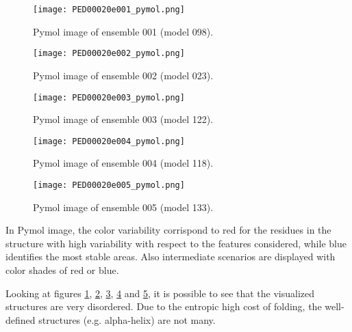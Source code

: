 \begin{figure}[H]
    \centering
		\texttt{[image: PED00020e001\_pymol.png]}
		\caption{Pymol image of ensemble 001 (model 098).}
		\label{model001p}
\end{figure}

\begin{figure}[H]
    \centering
		\texttt{[image: PED00020e002\_pymol.png]}
		\caption{Pymol image of ensemble 002 (model 023).}
		\label{model002p}
\end{figure}

\begin{figure}[H]
    \centering
		\texttt{[image: PED00020e003\_pymol.png]}
		\caption{Pymol image of ensemble 003 (model 122).}
		\label{model003p}
\end{figure}

\begin{figure}[H]
    \centering
		\texttt{[image: PED00020e004\_pymol.png]}
		\caption{Pymol image of ensemble 004 (model 118).}
		\label{model004p}
\end{figure}

\begin{figure}[H]
    \centering
		\texttt{[image: PED00020e005\_pymol.png]}
		\caption{Pymol image of ensemble 005 (model 133).}
		\label{model005p}
\end{figure}


\medskip
\medskip
In Pymol image, the color variability corrispond to red for the residues in the structure with high variability with respect to the features considered, while blue identifies the most stable areas. Also intermediate scenarios are displayed with color shades of red or blue.  

\medskip
Looking at figures \ref{model001p}, \ref{model002p}, \ref{model003p}, \ref{model004p} and \ref{model005p}, it is possible to see that the visualized structures are very disordered. Due to the entropic high cost of folding, the well-defined structures (e.g. alpha-helix) are not many. %
